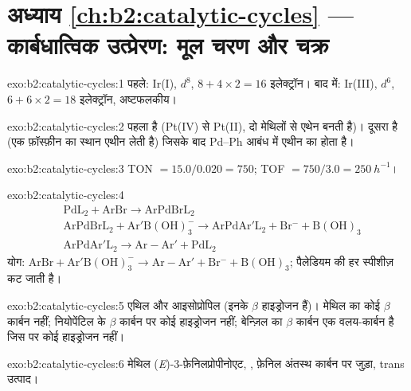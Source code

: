 \section*{अध्याय \ref{ch:b2:catalytic-cycles} --- कार्बधात्विक उत्प्रेरण: मूल चरण और चक्र}

\begin{solution}{exo:b2:catalytic-cycles:1}
पहले: Ir(I), $d^8$, $8 + 4 \times 2 = 16$ इलेक्ट्रॉन। बाद में: Ir(III), $d^6$, $6 + 6 \times 2 = 18$
इलेक्ट्रॉन, अष्टफलकीय।
\end{solution}

\begin{solution}{exo:b2:catalytic-cycles:2}
पहला  है (Pt(IV) से Pt(II), दो मेथिलों से एथेन बनती है)।
दूसरा  है (एक फ़ॉस्फ़ीन का स्थान एथीन लेती है) जिसके बाद
Pd--Ph आबंध में एथीन का  होता है।
\end{solution}

\begin{solution}{exo:b2:catalytic-cycles:3}
TON $= 15.0/0.020 = 750$; TOF $= 750/3.0 = \qty{250}{h^{-1}}$।
\end{solution}

\begin{solution}{exo:b2:catalytic-cycles:4}
\begin{align*}
  &\mathrm{PdL_2 + ArBr \to ArPdBrL_2}\\
  &\mathrm{ArPdBrL_2 + Ar'B(OH)_3^- \to ArPdAr'L_2 + Br^- + B(OH)_3}\\
  &\mathrm{ArPdAr'L_2 \to Ar{-}Ar' + PdL_2}
\end{align*}
योग: $\mathrm{ArBr + Ar'B(OH)_3^- \to Ar{-}Ar' + Br^- + B(OH)_3}$; पैलेडियम की हर स्पीशीज़
कट जाती है।
\end{solution}

\begin{solution}{exo:b2:catalytic-cycles:5}
एथिल और आइसोप्रोपिल (इनके $\beta$ हाइड्रोजन हैं)। मेथिल का कोई $\beta$ कार्बन नहीं; नियोपेंटिल के $\beta$
कार्बन पर कोई हाइड्रोजन नहीं; बेन्ज़िल का $\beta$ कार्बन एक  वलय-कार्बन है जिस पर
कोई हाइड्रोजन नहीं।
\end{solution}

\begin{solution}{exo:b2:catalytic-cycles:6}
मेथिल (\textit{E})-3-फ़ेनिलप्रोपीनोएट, , फ़ेनिल अंतस्थ
कार्बन पर जुड़ा, trans उत्पाद।
\end{solution}

